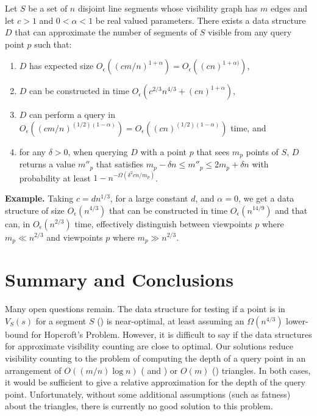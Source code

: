 \documentclass{patmorin}
\newcommand{\Oe}{O_\epsilon}
\begin{document}
\begin{thm}
  Let $S$ be a set of $n$ disjoint line segments whose visibility
  graph has $m$ edges and let $c>1$ and $0 < \alpha < 1$ be real valued
  parameters.  There exists a data structure $D$ that can approximate
  the number of segments of $S$ visible from any query point $p$ such that:
  \begin{enumerate}
   \item $D$ has expected size $\Oe((cm/n)^{1+\alpha}) =
          \Oe((cn)^{1+\alpha)})$,
   \item $D$ can be constructed in time
          $\Oe(c^{2/3}n^{4/3} + (cn)^{1+\alpha})$,
   \item $D$ can perform a query in $\Oe((cm/n)^{(1/2)(1-\alpha)}) =
          \Oe((cn)^{(1/2)(1-\alpha)})$ time, and
   \item for any $\delta > 0$, when querying $D$ with a point $p$
          that sees $m_p$ points of $S$, $D$ returns a
          value $m''_p$
          that satisfies $m_p - \delta n \le m''_p \le 2m_p + \delta n$
          with probability at least $1-n^{-\Omega(\delta^2 cn/m_p)}$.
  \end{enumerate}
\end{thm}

\noindent\textbf{Example.}  Taking $c=dn^{1/3}$, for a large constant $d$,
and $\alpha=0$, we get a data structure of size $\Oe(n^{4/3})$ that can
be constructed in time $\Oe(n^{14/9})$ and that can, in $\Oe(n^{2/3})$
time, effectively distinguish between viewpoints $p$ where $m_p \ll
n^{2/3}$ and viewpoints $p$ where $m_p \gg n^{2/3}$.

\section{Summary and Conclusions}


Many open questions remain.  The data structure for testing if a point is
in $V_S(s)$ for a segment $S$ () is near-optimal, at
least assuming an $\Omega(n^{4/3})$ lower-bound for Hopcroft's Problem.
However, it is difficult to say if the data structures for approximate
visibility counting are close to optimal.  Our solutions reduce visibility
counting to the problem of computing the depth of a query point in an
arrangement of $O((m/n)\log n)$ ( and
) or $O(m)$ () triangles.  In both
cases, it would be sufficient to give a relative approximation for the
depth of the query point.  Unfortunately, without some additional
assumptions (such as fatness) about the triangles, there is currently no
good solution to this problem.
\end{document}

